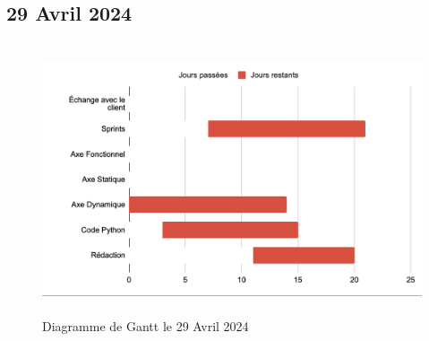 \subsection*{29 Avril 2024}
\begin{figure}[H]
	\centering
	\includegraphics[height=8cm]{img/gantt_290424.png}
	\caption{Diagramme de Gantt le 29 Avril 2024}
\end{figure}

